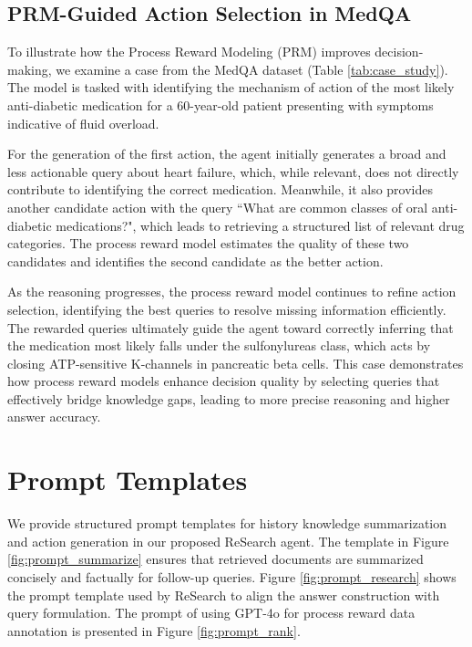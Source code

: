 \subsection{PRM-Guided Action Selection in MedQA}



To illustrate how the Process Reward Modeling (PRM) improves decision-making, we examine a case from the MedQA dataset (Table \ref{tab:case_study}). The model is tasked with identifying the mechanism of action of the most likely anti-diabetic medication for a 60-year-old patient presenting with symptoms indicative of fluid overload.

For the generation of the first action, the agent initially generates a broad and less actionable query about heart failure, which, while relevant, does not directly contribute to identifying the correct medication. Meanwhile, it also provides another candidate action with the query ``What are common classes of oral anti-diabetic medications?", which leads to retrieving a structured list of relevant drug categories. The process reward model estimates the quality of these two candidates and identifies the second candidate as the better action.

As the reasoning progresses, the process reward model continues to refine action selection, identifying the best queries to resolve missing information efficiently. The rewarded queries ultimately guide the agent toward correctly inferring that the medication most likely falls under the sulfonylureas class, which acts by closing ATP-sensitive K-channels in pancreatic beta cells.
This case demonstrates how process reward models enhance decision quality by selecting queries that effectively bridge knowledge gaps, leading to more precise reasoning and higher answer accuracy.

\section{Prompt Templates}

We provide structured prompt templates for history knowledge summarization and action generation in our proposed ReSearch agent. The template in Figure \ref{fig:prompt_summarize} ensures that retrieved documents are summarized concisely and factually for follow-up queries. Figure \ref{fig:prompt_research} shows the prompt template used by ReSearch to align the answer construction with query formulation. The prompt of using GPT-4o for process reward data annotation is presented in Figure \ref{fig:prompt_rank}.

